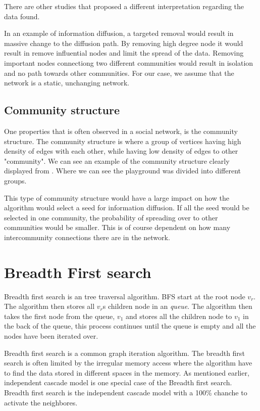 There are other studies that proposed a different interpretation regarding the data found.	

In an example of information diffusion, a targeted removal would result in massive change to the diffusion path. By removing high degree node it would result in remove influential nodes and limit the spread of the data. Removing important nodes connectiong two different communities would result in isolation and no path towards other communities. For our case, we assume that the network is a static, unchanging network. 

\subsection{Community structure}
One properties that is often observed in a social network, is the community structure. The community structure is where a group of vertices having high density of edges with each other, while having low density of edges to other "community". We can see an example of the community structure clearly displayed from  \cite{RaceInSchool}. Where we can see the playground was divided into different groups.

This type of community structure would have a large impact on how the algorithm would select a seed for information diffusion. If all the seed would be selected in one community, the probability of spreading over to other communities would be smaller. This is of course dependent on how many intercommunity connections there are in the network.

\section{Breadth First search}
Breadth first search is an tree traversal algorithm. BFS start at the root node \textit{$v_r$}. The algorithm then stores all $v_r$s children node in an \textit{queue}. The algorithm then takes the first node from the queue, \textit{$v_1$} and stores all the children node to \textit{$v_1$} in the back of the queue, this process continues until the queue is empty and all the nodes have been iterated over. 

Breadth first search is a common graph iteration algorithm. The breadth first search is often limited by the irregular memory access where the algorithm have to find the data stored in different spaces in the memory. As mentioned earlier, independent cascade model is one special case of the Breadth first search. Breadth first search is the independent cascade model with a 100\% chanche to activate the neighbores.




